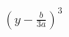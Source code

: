 \documentclass[preview]{standalone}
\begin{document}
\begin{align*}
\left(y-\frac{b}{3a}\right)^3
\end{align*}
\end{document}
